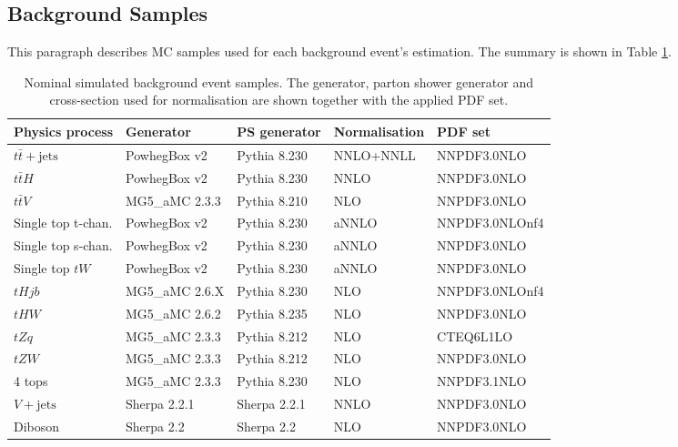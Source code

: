 \subsection{Background Samples}
\label{subsec:BkgSample}
This paragraph describes MC samples used for each background event's estimation. The summary is shown in Table \ref{tab:BkgSampleSummary}.

\begin{table}[H]
  \centering
  \begin{tabular*}{160mm}{@{\extracolsep{\fill}}lllll}
    \hline\hline
    Physics process & Generator & PS generator & Normalisation & PDF set\\
    \hline
    $t\bar{t}+\text{jets}$ & PowhegBox v2   & Pythia 8.230 & NNLO+NNLL & NNPDF3.0NLO\\
    $t\bar{t}H$            & PowhegBox v2   & Pythia 8.230 & NNLO      & NNPDF3.0NLO\\
    $t\bar{t}V$            & MG5\_aMC 2.3.3 & Pythia 8.210 & NLO       & NNPDF3.0NLO\\
    \hline
    Single top t-chan.     & PowhegBox v2   & Pythia 8.230 & aNNLO     & NNPDF3.0NLOnf4\\
    Single top s-chan.     & PowhegBox v2   & Pythia 8.230 & aNNLO     & NNPDF3.0NLO\\
    Single top $tW$        & PowhegBox v2   & Pythia 8.230 & aNNLO     & NNPDF3.0NLO\\
    \hline
    $tHjb$                 & MG5\_aMC 2.6.X & Pythia 8.230 & NLO       & NNPDF3.0NLOnf4\\
    $tHW$                  & MG5\_aMC 2.6.2 & Pythia 8.235 & NLO       & NNPDF3.0NLO\\
    $tZq$                  & MG5\_aMC 2.3.3 & Pythia 8.212 & NLO       & CTEQ6L1LO\\
    $tZW$                  & MG5\_aMC 2.3.3 & Pythia 8.212 & NLO       & NNPDF3.0NLO\\
    4 tops                 & MG5\_aMC 2.3.3 & Pythia 8.230 & NLO       & NNPDF3.1NLO\\
    \hline
    $V+\text{jets}$        & Sherpa 2.2.1   & Sherpa 2.2.1 & NNLO      & NNPDF3.0NLO\\
    Diboson                & Sherpa 2.2     & Sherpa 2.2   & NLO       & NNPDF3.0NLO\\
    \hline\hline
  \end{tabular*}
  \caption{Nominal simulated background event samples. The generator, parton shower generator and cross-section used for normalisation are shown together with the applied PDF set.}
  \label{tab:BkgSampleSummary}
\end{table}


